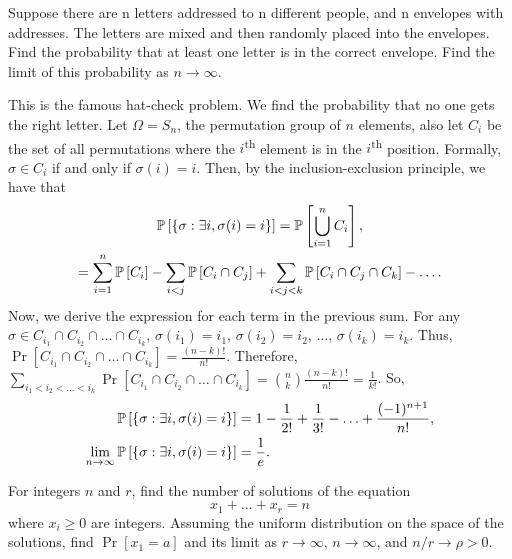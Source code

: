 \begin{problem}{5}
    Suppose there are n letters addressed to n different people, and n envelopes with addresses. The letters are mixed and then randomly placed into the envelopes. Find the probability that at least one letter is in the correct envelope. Find the limit of this probability as $n\to \infty$. 
\end{problem}
\begin{solution}
    This is the famous hat-check problem. We find the probability that no one
    gets the right letter. Let $\Omega = S_n$, the permutation group of $n$
    elements, also let $C_i$ be the set of all permutations where the
    $i$\textsuperscript{th} element is in the $i$\textsuperscript{th} position.
    Formally, $\sigma \in C_i$ if and only if $\sigma(i) = i$. Then, by the
    inclusion-exclusion principle, we have that 
    \begin{gather*}
        \mathbb{P}\left[{\left\{ \sigma: \exists i, \sigma(i) = i \right\}}\right] = \mathbb{P}\left[{\bigcup_{i=1}^n C_i}\right], \\
        = \sum_{i=1}^n \mathbb{P}\left[{C_i}\right] - \sum_{i < j} \mathbb{P}\left[{C_i \cap C_j}\right] + \sum_{i < j < k} \mathbb{P}\left[{C_i \cap C_j \cap C_k}\right] - \ldots.
    \end{gather*}
    Now, we derive the expression for each term in the previous sum. For any
    $\sigma \in C_{i_1} \cap C_{i_2} \cap \ldots \cap C_{i_k}$, $\sigma(i_1) =
    i_1$, $\sigma(i_2) = i_2$, $\ldots$, $\sigma(i_k) = i_k$. Thus,
    $\Pr\left[{C_{i_1} \cap C_{i_2} \cap \ldots \cap C_{i_k}}\right] =
    \frac{(n-k)!}{n!}$. Therefore, $\sum_{i_1 < i_2 < \ldots < i_k}
    \Pr\left[{C_{i_1} \cap C_{i_2} \cap \ldots \cap C_{i_k}}\right] =
    \binom{n}{k}\frac{(n-k)!}{n!} = \frac{1}{k!}$. So,
    \begin{align*}
        \mathbb{P}\left[{\left\{ \sigma: \exists i, \sigma(i) = i \right\}}\right] &= 1 - \frac{1}{2!} + \frac{1}{3!} - \ldots + \frac{(-1)^{n+1}}{n!}, \\
        \lim_{n\to\infty} \mathbb{P}\left[{\left\{ \sigma: \exists i, \sigma(i) = i \right\}}\right] &= \frac{1}{e}.
    \end{align*}
\end{solution}
\begin{problem}{6}
    For integers $n$ and $r$, find the number of solutions of the equation \[
        x_1 + \ldots + x_r = n  
    \]
    where $x_i \geq 0$ are integers. Assuming the uniform distribution on the space of the solutions, find $\Pr[x_1 = a]$ and its limit as $r\to\infty$, $n\to\infty$, and $n/r\to\rho>0$.
\end{problem}
